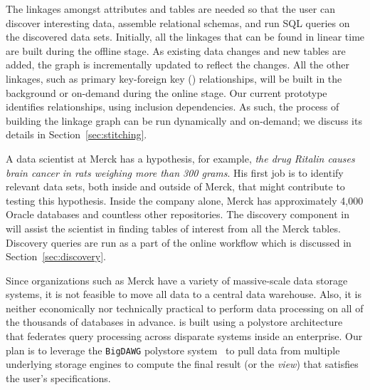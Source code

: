  The linkages amongst attributes and tables
are needed so that the user can discover interesting data, assemble relational
schemas, and run \textsf{SQL} queries on the discovered data sets. 
Initially, all the linkages that can be found in linear time are built during the offline stage. As existing data changes and new tables are added, the graph is incrementally updated to reflect the changes. All the other linkages, such as primary key-foreign key (\pkfk) relationships, will be
built in the background or on-demand during the online stage. Our current
prototype identifies \pkfk relationships, using inclusion dependencies. As such,
the process of building the linkage graph can be run dynamically and on-demand;
we discuss its details in Section~\ref{sec:stitching}.




\stitle{[Discovery.]} A data scientist at Merck has a hypothesis, for example,
{\it the drug Ritalin causes brain cancer in rats weighing more than 300 grams}.
His first job is to identify relevant data sets, both inside and outside of
Merck, that might contribute to testing this hypothesis. Inside the company
alone, Merck has approximately 4,000 Oracle databases and countless other
repositories. The discovery component in \dcv will assist the scientist in
finding tables of interest from all the Merck tables. Discovery queries are run
as a part of the online workflow which is discussed in
Section~\ref{sec:discovery}.






 Since organizations such as
Merck have a variety of massive-scale data storage systems, it is not feasible
to move all data to a central data warehouse. Also, it is neither economically
nor technically practical to perform data processing on all of the thousands of
databases in advance.  \dcv is built using a polystore
architecture~\cite{DBLP:journals/sigmod/DugganESBHKMMMZ15} that federates query
processing across disparate systems inside an enterprise. Our plan is to
leverage the \texttt{BigDAWG} polystore
system~\cite{DBLP:journals/pvldb/ElmoreDSBCGHHKK15} to pull data from multiple
underlying storage engines to compute the final result (or the {\em view}) that
satisfies the user's specifications.

